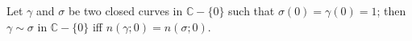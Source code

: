 Let $\gamma$ and $\sigma$ be two closed curves in $\mathbb{C} - \{0\}$ such that $\sigma(0) = \gamma(0) = 1$; then $\gamma \sim \sigma$ in $\mathbb{C} - \{0\}$ iff $n(\gamma; 0) = n(\sigma; 0)$.